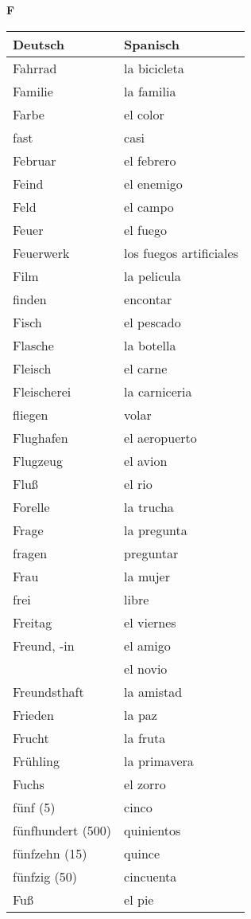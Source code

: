 \begin{flushright}\begin{Huge}\textbf{F}\end{Huge}\end{flushright}

\begin{longtable}{p{} p{}} 
\textbf{Deutsch}     & \textbf{Spanisch}                                       \\ \hline
\hline
\endhead %
Fahrrad & la bicicleta\\
Familie & la familia\\
Farbe & el color\\
fast & casi \\
Februar & el febrero\\
Feind & el enemigo\\
Feld & el campo\\
Feuer & el fuego\\
Feuerwerk & los fuegos artificiales\\
Film & la pelicula\\
finden & encontar\\
Fisch & el pescado\\
Flasche & la botella\\
Fleisch & el carne \\
Fleischerei & la carniceria\\
fliegen & volar\\
Flughafen & el aeropuerto\\
Flugzeug & el avion\\
Fluß & el rio\\
Forelle & la trucha \\
Frage & la pregunta\\
fragen & preguntar\\
Frau & la mujer \\
frei & libre\\
Freitag & el viernes\\
Freund, -in & el amigo\\
~ & el novio\\
Freundsthaft & la amistad\\
Frieden & la paz\\
Frucht & la fruta\\
Frühling & la primavera\\
Fuchs & el zorro\\
fünf (5) & cinco \\
fünfhundert (500) & quinientos\\
fünfzehn (15) & quince\\
fünfzig (50) & cincuenta\\
Fuß & el pie\\
\end{longtable}
